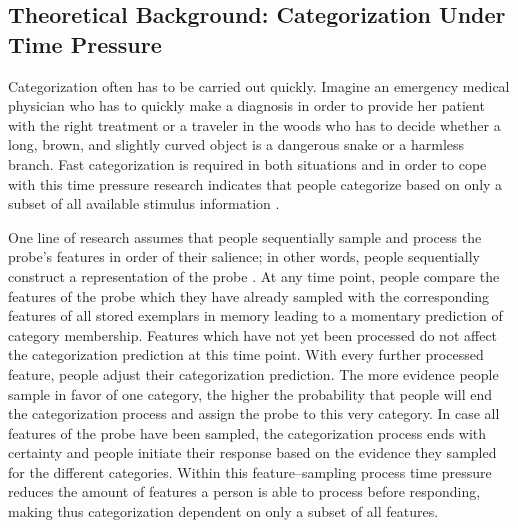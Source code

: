\documentclass[a4paper,man,natbib]{apa6}
\begin{document}

\subsection{Theoretical Background: Categorization Under Time Pressure}
Categorization often has to be carried out quickly. Imagine an emergency medical physician who has to quickly make a diagnosis in order to provide her patient with the right treatment or a traveler in the woods who has to decide whether a long, brown, and slightly curved object is a dangerous snake or a harmless branch. Fast categorization is required in both situations and in order to cope with this time pressure research indicates that people categorize based on only a subset of all available stimulus information \citep{lamberts1995categorization}. 

One line of research assumes that people sequentially sample and process the probe's features in order of their salience; in other words, people sequentially construct a representation of the probe \citep{lamberts1995categorization, lamberts2000information, lamberts2002feature}. At any time point, people compare the features of the probe which they have already sampled with the corresponding features of all stored exemplars in memory leading to a momentary prediction of category membership. Features which have not yet been processed do not affect the categorization prediction at this time point. With every further processed feature, people adjust their categorization prediction. The more evidence people sample in favor of one category, the higher the probability that people will end the categorization process and assign the probe to this very category. In case all features of the probe have been sampled, the categorization process ends with certainty and people initiate their response based on the evidence they sampled for the different categories. Within this feature--sampling process time pressure reduces the amount of features a person is able to process before responding, making thus categorization dependent on only a subset of all features. 
\end{document}
